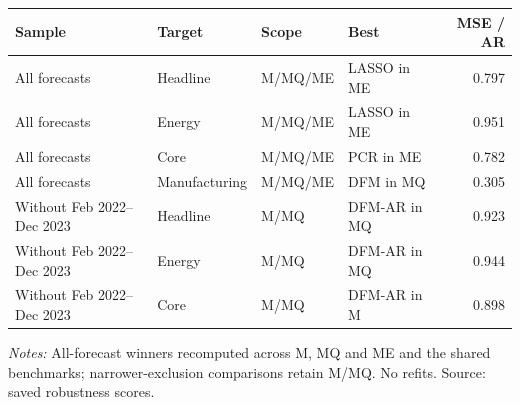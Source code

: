 \begin{threeparttable}
\begin{tabular}{llllr}
\toprule
Sample & Target & Scope & Best & MSE / AR \\
\midrule
All forecasts & Headline & M/MQ/ME & LASSO in ME & 0.797 \\
All forecasts & Energy & M/MQ/ME & LASSO in ME & 0.951 \\
All forecasts & Core & M/MQ/ME & PCR in ME & 0.782 \\
All forecasts & Manufacturing & M/MQ/ME & DFM in MQ & 0.305 \\
Without Feb 2022--Dec 2023 & Headline & M/MQ & DFM-AR in MQ & 0.923 \\
Without Feb 2022--Dec 2023 & Energy & M/MQ & DFM-AR in MQ & 0.944 \\
Without Feb 2022--Dec 2023 & Core & M/MQ & DFM-AR in M & 0.898 \\
\bottomrule
\end{tabular}
\begin{tablenotes}[flushleft]\footnotesize
\item \textit{Notes:} All-forecast winners recomputed across M, MQ and ME and the shared benchmarks; narrower-exclusion comparisons retain M/MQ. No refits. Source: saved robustness scores.
\end{tablenotes}
\end{threeparttable}
